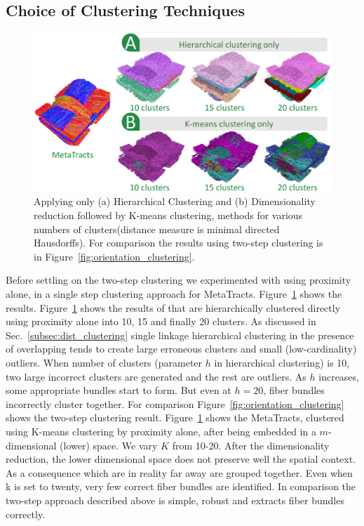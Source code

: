 \subsection{Choice of Clustering Techniques}\label{subsec:clus_choice}
\begin{figure}[htb]
	\centering
	\includegraphics[width=\linewidth]{images/comparison_all.eps}
	\caption{Applying only (a) Hierarchical Clustering and (b) Dimensionality reduction followed by K-means clustering, methods for various numbers of clusters(distance measure is minimal directed Hausdorffs).
		For comparison the results using two-step clustering is in Figure~\ref{fig:orientation_clustering}.}
	\label{fig:comparison}
\end{figure} 
Before settling on the two-step clustering we experimented with using proximity alone, in a single step clustering approach for MetaTracts. 
Figure~\ref{fig:comparison} shows the results. Figure~\ref{fig:comparison} shows the results of \mt that are hierarchically clustered directly using proximity alone into 10, 15 and finally 20 clusters. 
As discussed in Sec.~\ref{subsec:dist_clustering} single linkage hierarchical clustering in the presence of overlapping \mt tends to create large erroneous clusters and small (low-cardinality) outliers.
When number of clusters (parameter $h$ in hierarchical clustering) is 10, two large incorrect clusters are generated and the rest are outliers. As $h$ increases, some appropriate bundles start to form. But even at $h=20$, fiber bundles incorrectly cluster together. For comparison Figure~\ref{fig:orientation_clustering} shows the two-step clustering result. 
Figure~\ref{fig:comparison} shows the MetaTracts, clustered using K-means clustering by proximity alone, after being embedded in a $m$-dimensional (lower) space. We vary $K$ from 10-20. After the dimensionality reduction, the lower dimensional space does not preserve well the spatial context. As a consequence \mt which are in reality far away are grouped together. Even when k is set to twenty, very few correct fiber bundles are identified.  In comparison the two-step approach described above is simple, robust and extracts fiber bundles correctly.
